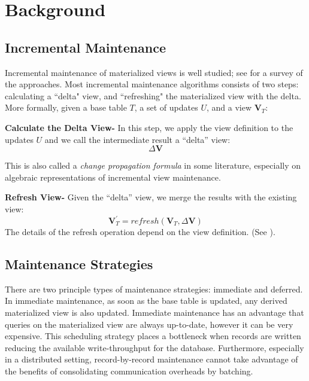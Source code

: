 \section{Background}\label{sec-background}

\subsection{Incremental Maintenance}
Incremental maintenance of materialized views is well studied; see \cite{chirkova2011materialized} for a survey of the approaches. 
Most incremental maintenance algorithms consists of two steps: calculating a ``delta" view,
and ``refreshing" the materialized view with the delta.
More formally, given a base table $T$, a set of updates $U$,
and a view $\textbf{V}_{T}$:

\textbf{Calculate the Delta View- }
In this step, we apply the view definition to the updates $U$ and we call
the intermediate result a ``delta'' view:
\[
\Delta\textbf{V}
\]

This is also called a \emph{change propagation formula} in some literature,
especially on algebraic representations of incremental view maintenance.

\textbf{Refresh View- }
Given the ``delta'' view, we merge the results with the existing
view:
\[
\textbf{V}_{T}^{'}=refresh(\textbf{V}_{T},\Delta\textbf{V})
\] 
The details of the refresh operation depend on the view definition.
(See \cite{chirkova2011materialized}).


\subsection{Maintenance Strategies}
There are two principle types of maintenance strategies: immediate and deferred. 
In immediate maintenance, as soon as the base table is updated, 
any derived materialized view is also updated.
Immediate maintenance has an advantage that queries on the materialized view are always up-to-date, 
however it can be very expensive.
This scheduling strategy places a bottleneck when records are written reducing 
the available write-throughput for the database.
Furthermore, especially in a distributed setting, record-by-record 
maintenance cannot take advantage of the benefits of consolidating communication overheads by batching.

